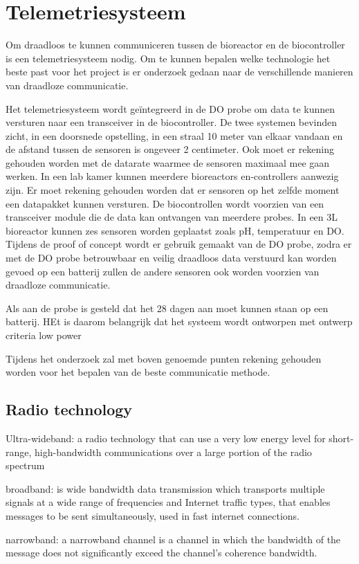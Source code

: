 \section{Telemetriesysteem}
Om draadloos te kunnen communiceren tussen de bioreactor en de biocontroller is een telemetriesysteem nodig. Om te kunnen bepalen welke technologie het beste past voor het project is er onderzoek gedaan naar de verschillende manieren van draadloze communicatie.

Het telemetriesysteem wordt geïntegreerd in de DO probe om data te kunnen versturen naar een transceiver in de biocontroller. De twee systemen bevinden zicht, in een doorsnede opstelling, in een straal 10 meter van elkaar vandaan en de afstand tussen de sensoren is ongeveer 2 centimeter. Ook moet er rekening gehouden worden met de datarate waarmee de sensoren maximaal mee gaan werken. In een lab kamer kunnen meerdere bioreactors en-controllers aanwezig zijn. Er moet rekening gehouden worden dat er sensoren op het zelfde moment een datapakket kunnen versturen. 
De biocontrollen wordt voorzien van een transceiver module die de data kan ontvangen van meerdere probes. In een 3L bioreactor kunnen zes sensoren worden geplaatst zoals pH, temperatuur en DO. Tijdens de proof of concept wordt er gebruik gemaakt van de DO probe, zodra er met de DO probe betrouwbaar en veilig draadloos data verstuurd kan worden gevoed op een batterij zullen de andere sensoren ook worden voorzien van draadloze communicatie. 

Als aan de probe is gesteld dat het 28 dagen aan moet kunnen staan op een batterij. HEt is daarom belangrijk dat het systeem wordt ontworpen met ontwerp criteria low power

Tijdens het onderzoek zal met boven genoemde punten rekening gehouden worden voor het bepalen van de beste communicatie methode. 

\subsection{Radio technology}
Ultra-wideband:  a radio technology that can use a very low energy level for short-range, high-bandwidth communications over a large portion of the radio spectrum

broadband: is wide bandwidth data transmission which transports multiple signals at a wide range of frequencies and Internet traffic types, that enables messages to be sent simultaneously, used in fast internet connections.

narrowband: a narrowband channel is a channel in which the bandwidth of the message does not significantly exceed the channel's coherence bandwidth. 

